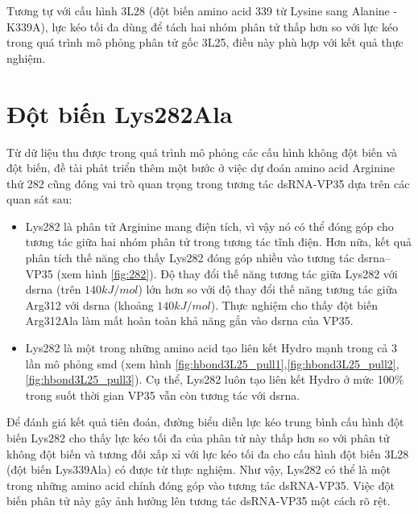 \documentclass[12pt,a4paper,reqno, oneside]{book}
\begin{document}
Tương tự với cấu hình 3L28 (đột biến amino acid 339 từ Lysine sang Alanine - \gls{K339A}), lực kéo tối đa dùng để tách hai nhóm phân tử thấp hơn so với lực kéo trong quá trình mô phỏng phân tử gốc 3L25, điều này phù hợp với kết quả thực nghiệm\cite{Leung2010}.
\section{Đột biến Lys282Ala}
Từ dữ liệu thu được trong quá trình mô phỏng các cấu hình không đột biến và đột biến, đề tài phát triển thêm một bước ở việc dự đoán amino acid Arginine thứ 282 cũng đóng vai trò quan trọng trong tương tác dsRNA-VP35 dựa trên các quan sát sau:
\begin{itemize}
\item Lys282 là phân tử Arginine mang điện tích, vì vậy nó có thể đóng góp cho tương tác giữa hai nhóm phân tử trong tương tác tĩnh điện. Hơn nữa, kết quả phân tích thế năng cho thấy Lys282 đóng góp nhiều vào tương tác \gls{dsrna}--VP35 (xem hình \ref{fig:282}). Độ thay đổi thế năng tương tác giữa Lys282 với \gls{dsrna} (trên $140kJ/mol$) lớn hơn so với độ thay đổi thế năng tương tác giữa Arg312 với \gls{dsrna} (khoảng $140kJ/mol$). Thực nghiệm cho thấy đột biến Arg312Ala làm mất hoàn toàn khả năng gắn vào \gls{dsrna} của VP35.
\item Lys282 là một trong những amino acid tạo liên kết Hydro mạnh trong cả 3 lần mô phỏng \gls{smd} (xem hình \ref{fig:hbond3L25_pull1},\ref{fig:hbond3L25_pull2},\ref{fig:hbond3L25_pull3}). Cụ thể, Lys282 luôn tạo liên kết Hydro ở mức 100\% trong suốt thời gian VP35 vẫn còn tương tác với \gls{dsrna}.
\end{itemize}
Để đánh giá kết quả tiên đoán, đường biểu diễn lực kéo trung bình cấu hình đột biến Lys282 cho thấy lực kéo tối đa của phân tử này thấp hơn so với phân tử không đột biến và tương đối xấp xỉ với lực kéo tối đa cho cấu hình đột biến 3L28 (đột biến Lys339Ala) có được từ thực nghiệm. Như vậy, Lys282 có thể là một trong những amino acid chính đóng góp vào tương tác dsRNA-VP35. Việc đột biến phân tử này gây ảnh hưởng lên tương tác dsRNA-VP35 một cách rõ rệt.
\end{document}
